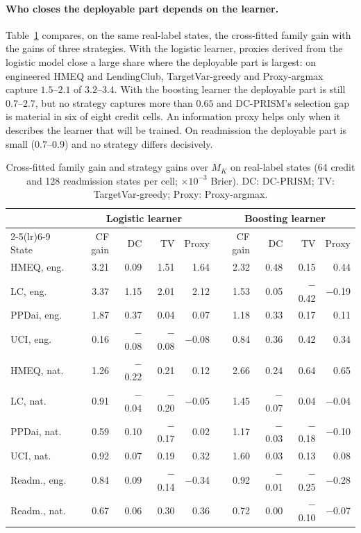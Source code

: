 \documentclass[runningheads]{llncs}
\begin{document}
\paragraph{Who closes the deployable part depends on the learner.} Table~\ref{tab:who} compares, on the same real-label states, the cross-fitted family gain with the gains of three strategies. With the logistic learner, proxies derived from the logistic model close a large share where the deployable part is largest: on engineered HMEQ and LendingClub, TargetVar-greedy and Proxy-argmax capture $1.5$--$2.1$ of $3.2$--$3.4$. With the boosting learner the deployable part is still $0.7$--$2.7$, but no strategy captures more than $0.65$ and DC-PRISM's selection gap is material in six of eight credit cells. An information proxy helps only when it describes the learner that will be trained. On readmission the deployable part is small ($0.7$--$0.9$) and no strategy differs decisively.

\begin{table}[t]
\caption{Cross-fitted family gain and strategy gains over $M_K$ on real-label states (64 credit and 128 readmission states per cell; $\times10^{-3}$ Brier). DC: DC-PRISM; TV: TargetVar-greedy; Proxy: Proxy-argmax.}
\label{tab:who}
\centering\scriptsize
\setlength{\tabcolsep}{3pt}
\begin{tabular}{lrrrrrrrr}
\toprule
& \multicolumn{4}{c}{Logistic learner} & \multicolumn{4}{c}{Boosting learner} \\
\cmidrule(lr){2-5}\cmidrule(lr){6-9}
State & CF gain & DC & TV & Proxy & CF gain & DC & TV & Proxy \\
\midrule
HMEQ, eng. & 3.21 & 0.09 & 1.51 & 1.64 & 2.32 & 0.48 & 0.15 & 0.44 \\
LC, eng. & 3.37 & 1.15 & 2.01 & 2.12 & 1.53 & 0.05 & $-$0.42 & $-$0.19 \\
PPDai, eng. & 1.87 & 0.37 & 0.04 & 0.07 & 1.18 & 0.33 & 0.17 & 0.11 \\
UCI, eng. & 0.16 & $-$0.08 & $-$0.08 & $-$0.08 & 0.84 & 0.36 & 0.42 & 0.34 \\
HMEQ, nat. & 1.26 & $-$0.22 & 0.21 & 0.12 & 2.66 & 0.24 & 0.64 & 0.65 \\
LC, nat. & 0.91 & $-$0.04 & $-$0.20 & $-$0.05 & 1.45 & $-$0.07 & 0.04 & $-$0.04 \\
PPDai, nat. & 0.59 & 0.10 & $-$0.17 & 0.02 & 1.17 & $-$0.03 & $-$0.18 & $-$0.10 \\
UCI, nat. & 0.92 & 0.07 & 0.19 & 0.32 & 1.60 & 0.03 & 0.13 & 0.08 \\
Readm., eng. & 0.84 & 0.09 & $-$0.14 & $-$0.34 & 0.92 & $-$0.01 & $-$0.25 & $-$0.28 \\
Readm., nat. & 0.67 & 0.06 & 0.30 & 0.36 & 0.72 & 0.00 & $-$0.10 & $-$0.07 \\
\bottomrule
\end{tabular}
\end{table}
\end{document}
